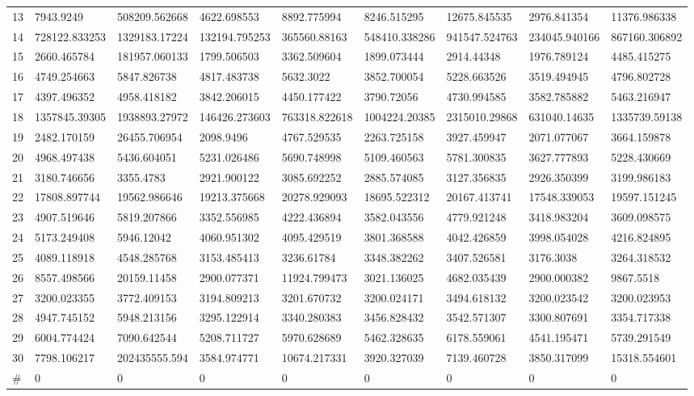 \begin{table*}[t]
\begin{tabular}{|p{0.8cm}|p{1.6cm}|p{1.6cm}|p{1.6cm}|p{1.6cm}|p{1.6cm}|p{1.6cm}|p{1.6cm}|p{1.6cm}|}
13  & 7943.9249 & 508209.562668 & 4622.698553 & 8892.775994 & 8246.515295 & 12675.845535 & 2976.841354 & 11376.986338 \\ 
14  & 728122.833253 & 1329183.17224 & 132194.795253 & 365560.88163 & 548410.338286 & 941547.524763 & 234045.940166 & 867160.306892 \\ 
15  & 2660.465784 & 181957.060133 & 1799.506503 & 3362.509604 & 1899.073444 & 2914.44348 & 1976.789124 & 4485.415275 \\ 
16  & 4749.254663 & 5847.826738 & 4817.483738 & 5632.3022 & 3852.700054 & 5228.663526 & 3519.494945 & 4796.802728 \\ 
17  & 4397.496352 & 4958.418182 & 3842.206015 & 4450.177422 & 3790.72056 & 4730.994585 & 3582.785882 & 5463.216947 \\ 
18  & 1357845.39305 & 1938893.27972 & 146426.273603 & 763318.822618 & 1004224.20385 & 2315010.29868 & 631040.14635 & 1335739.59138 \\ 
19  & 2482.170159 & 26455.706954 & 2098.9496 & 4767.529535 & 2263.725158 & 3927.459947 & 2071.077067 & 3664.159878 \\ 
20  & 4968.497438 & 5436.604051 & 5231.026486 & 5690.748998 & 5109.460563 & 5781.300835 & 3627.777893 & 5228.430669 \\ 
21  & 3180.746656 & 3355.4783 & 2921.900122 & 3085.692252 & 2885.574085 & 3127.356835 & 2926.350399 & 3199.986183 \\ 
22  & 17808.897744 & 19562.986646 & 19213.375668 & 20278.929093 & 18695.522312 & 20167.413741 & 17548.339053 & 19597.151245 \\ 
23  & 4907.519646 & 5819.207866 & 3352.556985 & 4222.436894 & 3582.043556 & 4779.921248 & 3418.983204 & 3609.098575 \\ 
24  & 5173.249408 & 5946.12042 & 4060.951302 & 4095.429519 & 3801.368588 & 4042.426859 & 3998.054028 & 4216.824895 \\ 
25  & 4089.118918 & 4548.285768 & 3153.485413 & 3236.61784 & 3348.382262 & 3407.526581 & 3176.3038 & 3264.318532 \\ 
26  & 8557.498566 & 20159.11458 & 2900.077371 & 11924.799473 & 3021.136025 & 4682.035439 & 2900.000382 & 9867.5518 \\ 
27  & 3200.023355 & 3772.409153 & 3194.809213 & 3201.670732 & 3200.024171 & 3494.618132 & 3200.023542 & 3200.023953 \\ 
28  & 4947.745152 & 5948.213156 & 3295.122914 & 3340.280383 & 3456.828432 & 3542.571307 & 3300.807691 & 3354.717338 \\ 
29  & 6004.774424 & 7090.642544 & 5208.711727 & 5970.628689 & 5462.328635 & 6178.559061 & 4541.195471 & 5739.291549 \\ 
30  & 7798.106217 & 202435555.594 & 3584.974771 & 10674.217331 & 3920.327039 & 7139.460728 & 3850.317099 & 15318.554601 \\ 
\hline
\#  & 0 & 0 & 0 & 0 & 0 & 0 & 0 & 0 \\
\hline


\end{tabular}
\end{table*}
